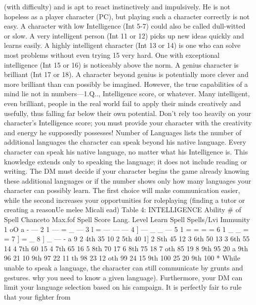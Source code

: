 \documentclass[../main.tex]{subfiles}
\begin{document}
\begin{multicols}{3}
(with difficulty) and is apt to react instinctively and impulsively. He is not hopeless as
a player character (PC), but playing such a
character correctly is not easy. A character
with low Intelligence (Int 5-7) could also be
called dull-witted or slow. A very intelligent
person (Int 11 or 12) picks up new ideas
quickly and learns easily. A highly intelligent character (Int 13 or 14) is one who can
solve most problems without even trying
15
very hard. One with exceptional intelligence (Int 15 or 16) is noticeably above the
norm. A genius character is brilliant (Int 17
or 18). A character beyond genius is potentially more clever and more brilliant than
can possibly be imagined.
However, the true capabilities of a mind
lie not in numbers—1.Q.., Intelligence score,
or whatever. Many intelligent, even brilliant, people in the real world fail to apply
their minds creatively and usefully, thus
falling far below their own potential. Don't
rely too heavily on your character's Intelligence score; you must provide your character with the creativity and energy he
supposedly possesses!
Number of Languages lists the number of
additional languages the character can
speak beyond his native language. Every
character can speak his native language, no
matter what his Intelligence is. This knowledge extends only to speaking the language;
it does not include reading or writing. The
DM must decide if your character begins the
game already knowing these additional languages or if the number shows only how
many languages your character can possibly learn. The first choice will make communication easier, while the second
increases your opportunities for roleplaying (finding a tutor or creating a reasonUe melee Micali ead)
Table 4: INTELLIGENCE
Ability # of Spell Chanceto Max.fof Spell
Score Lang. Level Learn Spell Spells/Lvi Immunity
1 oO a - —
2 1 — = _ —
3 l = — — —
4 ] — _ _ —
5 1 = = = =
6 1 _ _ = =
7 ] = _
8 ] _ — - a
9 2 4th 35%
10 2 5th 40%
1] 2 Sth 45%
12 3 6th 50%
13 3 6th 55%
14 4 7th 60%
15 4 7th 65%
16 5 8th 70%
17 6 8th 75%
18 7 oth 85%
19 8 9th 95%
20 a 9th 96 %
21 10 9th 97 %
22 11 th 98 %
23 12 oth 99 %
24 15 9th 100%
25 20 9th 100%
* While unable to speak a language, the character can still communicate
by grunts and gestures.
why you need to know a given language).
Furthermore, your DM can limit your language selection based on his campaign. It is
perfectly fair to rule that your fighter from

\end{multicols}
\end{document}
